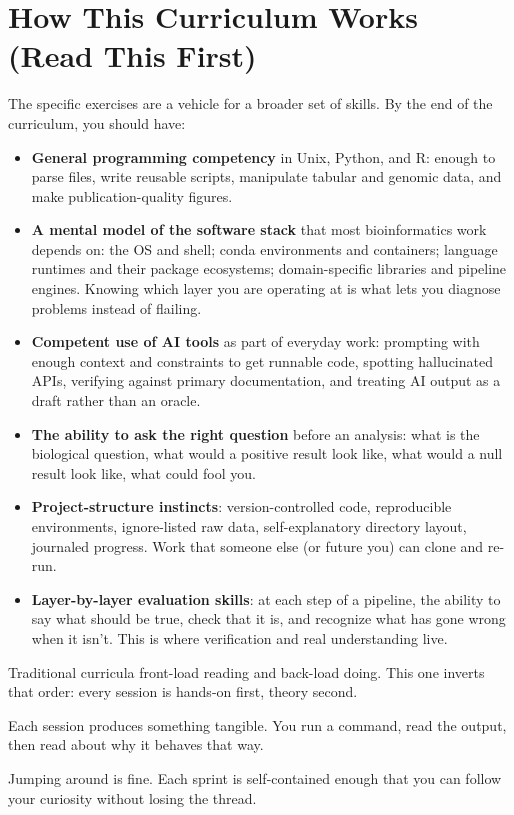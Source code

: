 \chapter{How This Curriculum Works (Read This First)}

\begin{brainbox}
The specific exercises are a vehicle for a broader set of skills. By the end of the curriculum, you should have:
\begin{itemize}[nosep]
  \item \textbf{General programming competency} in Unix, Python, and R: enough to parse files, write reusable scripts, manipulate tabular and genomic data, and make publication-quality figures.
  \item \textbf{A mental model of the software stack} that most bioinformatics work depends on: the OS and shell; conda environments and containers; language runtimes and their package ecosystems; domain-specific libraries and pipeline engines. Knowing which layer you are operating at is what lets you diagnose problems instead of flailing.
  \item \textbf{Competent use of AI tools} as part of everyday work: prompting with enough context and constraints to get runnable code, spotting hallucinated APIs, verifying against primary documentation, and treating AI output as a draft rather than an oracle.
  \item \textbf{The ability to ask the right question} before an analysis: what is the biological question, what would a positive result look like, what would a null result look like, what could fool you.
  \item \textbf{Project-structure instincts}: version-controlled code, reproducible environments, ignore-listed raw data, self-explanatory directory layout, journaled progress. Work that someone else (or future you) can clone and re-run.
  \item \textbf{Layer-by-layer evaluation skills}: at each step of a pipeline, the ability to say what should be true, check that it is, and recognize what has gone wrong when it isn't. This is where verification and real understanding live.
\end{itemize}
\end{brainbox}

\begin{brainbox}
Traditional curricula front-load reading and back-load doing. This one inverts that order: every session is hands-on first, theory second.

Each session produces something tangible. You run a command, read the output, then read about why it behaves that way.

Jumping around is fine. Each sprint is self-contained enough that you can follow your curiosity without losing the thread.
\end{brainbox}


